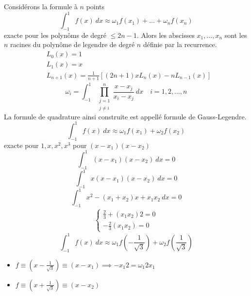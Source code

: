 \begin{prop}
   Considérons la formule à $n$ points
   \[
   \int_{{-1}}^{{1}} {f(x)} \: d{x} \approx \omega_1f(x_1) + \ldots + \omega_nf(x_n)
   \] 
   exacte pour les polynôms de degré $\le 2n - 1$. Alors les abscisses $x_1, \ldots, x_n$ sont les $n$ racines du polynôme de legendre de degré  $n$ définie par la recurrence.
    \begin{align*}
       &L_0(x) = 1\\
       &L_1(x) = x\\
       &L_{n+1}(x) = \frac{1}{n+1}\left[ (2n + 1)xL_n(x) - nL_{n-1}(x) \right] 
   \end{align*}
   \[
       \omega_i = \int_{{-1}}^{{1}} {\prod_{\substack{j=1 \\ j \neq i}}^{n} \frac{x - x_j}{x_i - x_j} } \: d{x} {} \quad i = 1, 2, \ldots, n
   \] 
   La formule de quadrature ainsi construite est appellé formule de Gauss-Legendre.
   \[
   \int_{{-1}}^{{1}} {f(x)} \: d{x} \approx \omega_1f(x_1) + \omega_2f(x_2)
   \] 
   exacte pour $1, x, x^2, x^3$ pour  $(x - x_1)(x - x_2)$
   \[
   \int_{{-1}}^{{1}} {(x - x_1)(x - x_2)} \: d{x} {= 0}
   \] 
   \[
   \int_{{-1}}^{{1}} {x(x - x_1)(x - x_2)} \: d{x} {= 0}
   \] 
   \[
   \int_{{-1}}^{{1}} {x^2 - (x_1 + x_2)x + x_1x_2} \: d{x} {= 0}
   \] 
   \begin{align*}
       \begin{cases}
           \frac{2}{3} + (x_1x_2)2 = 0\\
           -\frac{2}{3}(x_1x_2) = 0
       \end{cases}
   \end{align*}
   \[
   \int_{{-1}}^{{1}} {f(x)} \: d{x} {\approx \omega_1f(-\frac{1}{\sqrt{3} })} + \omega_2 f(\frac{1}{\sqrt{3} })
   \] 
   \begin{itemize}
       \item $f \equiv (x - \frac{1}{\sqrt{3} }) \equiv (x - x_1) \implies -x_{1}2 = \omega_1 2 x_1$
       \item $f \equiv (x + \frac{1}{\sqrt{3} }) \equiv (x - x_{2}) $
   \end{itemize}
\end{prop}
